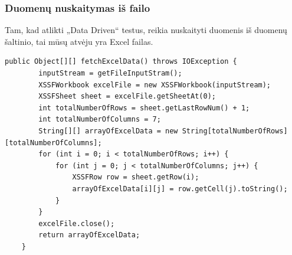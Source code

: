 \documentclass[a4paper,12pt,fleqn]{article}
\begin{document}
\newpage
\subsubsection{Duomenų nuskaitymas iš failo}
Tam, kad atlikti „Data Driven“ testus, reikia nuskaityti duomenis iš duomenų šaltinio, tai mūsų atvėju yra Excel failas.
\begin{lstlisting}[caption={Duomenų nuskaitymas iš Excel failo.}]
    public Object[][] fetchExcelData() throws IOException {
        inputStream = getFileInputStram();
        XSSFWorkbook excelFile = new XSSFWorkbook(inputStream);
        XSSFSheet sheet = excelFile.getSheetAt(0);
        int totalNumberOfRows = sheet.getLastRowNum() + 1;
        int totalNumberOfColumns = 7;
        String[][] arrayOfExcelData = new String[totalNumberOfRows][totalNumberOfColumns];
        for (int i = 0; i < totalNumberOfRows; i++) {
            for (int j = 0; j < totalNumberOfColumns; j++) {
                XSSFRow row = sheet.getRow(i);
                arrayOfExcelData[i][j] = row.getCell(j).toString();
            }
        }
        excelFile.close();
        return arrayOfExcelData;
    }
\end{lstlisting}

    


\newpage
\end{document}
